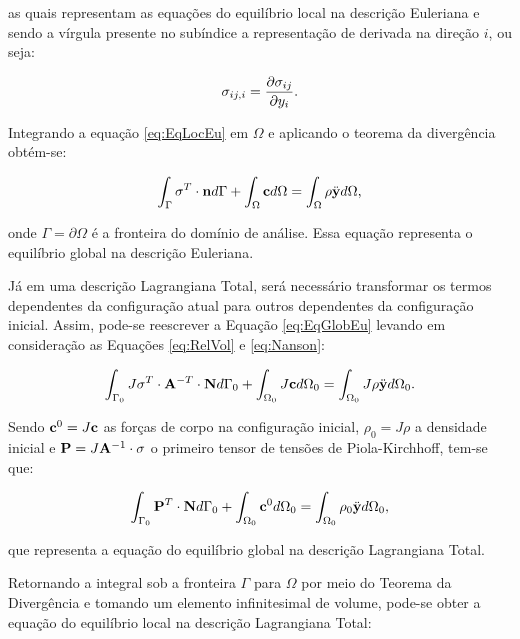 \documentclass[_ArquivoPrincipal.tex]{subfiles}
\begin{document}
\noindent as quais representam as equações do equilíbrio local na descrição Euleriana e sendo a vírgula presente no subíndice a representação de derivada na direção $i$, ou seja:

\begin{equation}
    \sigma_{ij,i}=\frac{\partial{\sigma_{ij}}}{\partial{y_i}}\text{.}
\end{equation}

Integrando a equação \ref{eq:EqLocEu} em $\Omega$ e aplicando o teorema da divergência obtém-se:

\begin{equation}
    \int_\Gamma{\mathbf{\sigma}^T\cdot\mathbf{n}d\Gamma}+\int_\Omega{\mathbf{c}d\Omega}=\int_\Omega{\rho\ddot{\mathbf{y}}d\Omega}
    \text{,}
    \label{eq:EqGlobEu}
\end{equation}

\noindent onde $\Gamma=\partial\Omega$ é a fronteira do domínio de análise. Essa equação representa o equilíbrio global na descrição Euleriana.

Já em uma descrição Lagrangiana Total, será necessário transformar os termos dependentes da configuração atual para outros dependentes da configuração inicial. Assim, pode-se reescrever a Equação \ref{eq:EqGlobEu} levando em consideração as Equações \ref{eq:RelVol} e \ref{eq:Nanson}:

\begin{equation}
    \int_{\Gamma_0}{J\mathbf{\sigma}^T\cdot\mathbf{A}^{-T}\cdot\mathbf{N}d\Gamma_0}+\int_{\Omega_0}{J\mathbf{c}d\Omega_0}=\int_{\Omega_0}{J\rho\ddot{\mathbf{y}}d\Omega_0}
    \text{.}
\end{equation}

\noindent Sendo $\mathbf{c}^0=J\mathbf{c}$ as forças de corpo na configuração inicial, $\rho_0=J\rho$ a densidade inicial e $\mathbf{P}=J\mathbf{A}^{-1}\cdot\mathbf{\sigma}$ o primeiro tensor de tensões de Piola-Kirchhoff, tem-se que:

\begin{equation}
    \int_{\Gamma_0}{\mathbf{P}^T\cdot\mathbf{N}d\Gamma_0}+\int_{\Omega_0}{\mathbf{c}^0d\Omega_0}=\int_{\Omega_0}{\rho_0\ddot{\mathbf{y}}d\Omega_0}\text{,}
\end{equation}

\noindent que representa a equação do equilíbrio global na descrição Lagrangiana Total.

Retornando a integral sob a fronteira $\Gamma$ para $\Omega$ por meio do Teorema da Divergência e tomando um elemento infinitesimal de volume, pode-se obter a equação do equilíbrio local na descrição Lagrangiana Total:
\end{document}
